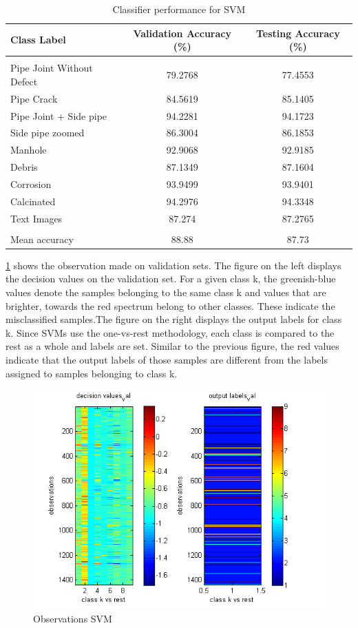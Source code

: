 \documentclass[letterpaper,12pt, onecolumn]{article}%
\begin{document}
\begin{table}[!htbp]
\centering
 \begin{tabular}{ l c c }
 \hline
 Class Label & Validation Accuracy (\%) &  Testing Accuracy (\%)  \\ [0.5ex]
 \hline\hline \\ [-1.5ex]
	Pipe Joint Without Defect & 79.2768 & 77.4553  \\ 
	Pipe Crack & 84.5619 & 85.1405  \\ 
	Pipe Joint + Side pipe  & 94.2281 & 94.1723  \\ [1ex]
	Side pipe zoomed  & 86.3004 & 86.1853  \\ [1ex]
	Manhole  & 92.9068 & 92.9185  \\ [1ex]
 	Debris  & 87.1349 & 87.1604  \\ [1ex]
	Corrosion  & 93.9499 & 93.9401  \\ [1ex]
	Calcinated  & 94.2976 & 94.3348  \\ [1ex]
	Text Images  & 87.274 & 87.2765  \\ [1ex]
\hline \\ [-1.5ex]
	Mean accuracy  & 88.88 & 87.73  \\ [1ex]
 \hline
 \end{tabular}
  	   \caption{Classifier performance for SVM}
       \label{tab:classifier_performance_svm}
\end{table}

\cref{fig:obssvm} shows the observation made on validation sets. The figure on the left displays the decision values on the validation set. For a given class k, the greenish-blue values denote the samples belonging to the same class k and values that are brighter, towards the red spectrum belong to other classes. These indicate the misclassified samples.The figure on the right displays the output labels for class k. Since SVMs use the one-vs-rest methodology, each class is compared to the rest as a whole and labels are set. Similar to the previous figure, the red values indicate that the output labels of those samples are different from the labels assigned to samples belonging to class k. 
\begin{figure}[!hbtp]
 	  \centering
 	   \includegraphics[scale=0.75] {svm_dec_val.png} 
 	   \caption{Observations SVM}
       \label{fig:obssvm}
\end{figure}
\end{document}
